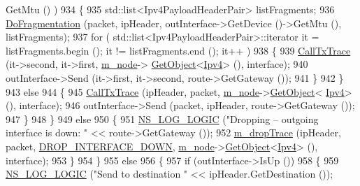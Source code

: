 \begin{DoxyCode}
      GetMtu () )
934             \{
935               std::list<Ipv4PayloadHeaderPair> listFragments;
936               \hyperlink{classns3_1_1Ipv4L3Protocol_a5ea602dc1447746c0c3bd90e36ec3888}{DoFragmentation} (packet, ipHeader, outInterface->GetDevice ()->GetMtu (), 
      listFragments);
937               \textcolor{keywordflow}{for} ( std::list<Ipv4PayloadHeaderPair>::iterator it = listFragments.begin (); it != 
      listFragments.end (); it++ )
938                 \{
939                   \hyperlink{classns3_1_1Ipv4L3Protocol_a04cbb7540c6f22a2870f118715b6a703}{CallTxTrace} (it->second, it->first, \hyperlink{classns3_1_1Ipv4L3Protocol_ad2cc5076c247724f1e99b398edc1965a}{m\_node}->
      \hyperlink{classns3_1_1Object_a13e18c00017096c8381eb651d5bd0783}{GetObject}<\hyperlink{classns3_1_1Ipv4_a1c15284fe630c76e0c9c75a97f1ff234}{Ipv4}> (), interface);
940                   outInterface->Send (it->first, it->second, route->GetGateway ());
941                 \}
942             \}
943           \textcolor{keywordflow}{else}
944             \{
945               \hyperlink{classns3_1_1Ipv4L3Protocol_a04cbb7540c6f22a2870f118715b6a703}{CallTxTrace} (ipHeader, packet, \hyperlink{classns3_1_1Ipv4L3Protocol_ad2cc5076c247724f1e99b398edc1965a}{m\_node}->\hyperlink{classns3_1_1Object_a13e18c00017096c8381eb651d5bd0783}{GetObject}<
      \hyperlink{classns3_1_1Ipv4_a1c15284fe630c76e0c9c75a97f1ff234}{Ipv4}> (), interface);
946               outInterface->Send (packet, ipHeader, route->GetGateway ());
947             \}
948         \}
949       \textcolor{keywordflow}{else}
950         \{
951           \hyperlink{group__logging_ga88acd260151caf2db9c0fc84997f45ce}{NS\_LOG\_LOGIC} (\textcolor{stringliteral}{"Dropping -- outgoing interface is down: "} << route->GetGateway ());
952           \hyperlink{classns3_1_1Ipv4L3Protocol_a80984e2de6a2562b04195b975014cb1b}{m\_dropTrace} (ipHeader, packet, \hyperlink{classns3_1_1Ipv4L3Protocol_a05e7403d60c79529257c4cffdd994da1a8f40f145dce3e9f21e1218ce125a048d}{DROP\_INTERFACE\_DOWN}, 
      \hyperlink{classns3_1_1Ipv4L3Protocol_ad2cc5076c247724f1e99b398edc1965a}{m\_node}->\hyperlink{classns3_1_1Object_a13e18c00017096c8381eb651d5bd0783}{GetObject}<\hyperlink{classns3_1_1Ipv4_a1c15284fe630c76e0c9c75a97f1ff234}{Ipv4}> (), interface);
953         \}
954     \} 
955   \textcolor{keywordflow}{else} 
956     \{
957       \textcolor{keywordflow}{if} (outInterface->IsUp ())
958         \{
959           \hyperlink{group__logging_ga88acd260151caf2db9c0fc84997f45ce}{NS\_LOG\_LOGIC} (\textcolor{stringliteral}{"Send to destination "} << ipHeader.GetDestination ());

\end{DoxyCode}

